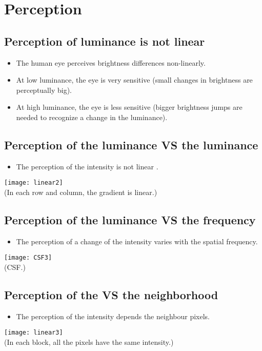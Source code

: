 \chapter{Perception}

\section{Perception of luminance is not linear}
\begin{itemize}
\item The human eye perceives brightness differences non-linearly.
\item At low luminance, the eye is very sensitive (small changes in
  brightness are perceptually big).
\item At high luminance, the eye is less sensitive (bigger brightness
  jumps are needed to recognize a change in the luminance).
\end{itemize}

\section{Perception of the luminance VS the luminance}
\begin{itemize}
\item The perception of the intensity is not linear \cite{wikipedia_lightness}.
\end{itemize}
\begin{center}
  \texttt{[image: linear2]}\\
  (In each row and column, the gradient is linear.)
\end{center}

\section{Perception of the luminance VS the frequency}
\begin{itemize}
\item The perception of a change of the intensity varies with the spatial frequency.
\end{itemize}
\begin{center}
  \texttt{[image: CSF3]}\\
  (\gls{CSF}.)
\end{center}

\section{Perception of the  VS the neighborhood}
\begin{itemize}
\item The perception of the intensity depends the neighbour pixels.
\end{itemize}
\begin{center}
  \texttt{[image: linear3]}\\
  (In each block, all the pixels have the same intensity.)
\end{center}

